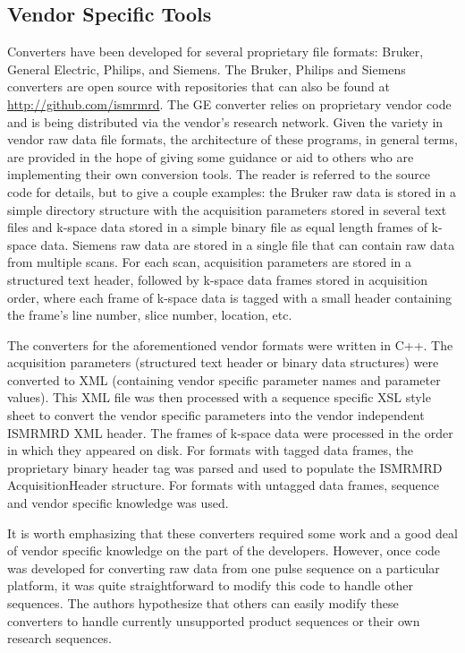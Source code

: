 \documentclass[12pt]{article}
\begin{document}
\subsection*{Vendor Specific Tools}
Converters have been developed for several proprietary file formats: Bruker, General Electric, Philips, and Siemens.  The Bruker, Philips and Siemens converters are open source with repositories that can also be found at \url{http://github.com/ismrmrd}.  The GE converter relies on proprietary vendor code and is being distributed via the vendor's research network.  Given the variety in vendor raw data file formats, the architecture of these programs, in general terms, are provided in the hope of giving some guidance or aid to others who are implementing their own conversion tools.  The reader is referred to the source code for  details, but to give a couple examples: the Bruker raw data is stored in a simple directory structure with the acquisition parameters stored in several text files and k-space data stored in a simple binary file as equal length frames of k-space data.  Siemens raw data are stored in a single file that can contain raw data from multiple scans.  For each scan, acquisition parameters are stored in a structured text header, followed by k-space data frames stored in acquisition order, where each frame of k-space data is tagged with a small header containing the frame's line number, slice number, location, etc.  

The converters for the aforementioned vendor formats were written in C++.  The acquisition parameters (structured text header or binary data structures) were converted to XML (containing vendor specific parameter names and parameter values).  This XML file was then processed with a sequence specific XSL style sheet to convert the vendor specific parameters into the vendor independent ISMRMRD XML header.  The frames of k-space data were processed in the order in which they appeared on disk.  For formats with tagged data frames, the proprietary binary header tag was parsed and used to populate the ISMRMRD AcquisitionHeader structure.  For formats with untagged data frames, sequence and vendor specific knowledge was used.  

It is worth emphasizing that these converters required some work and a good deal of vendor specific knowledge on the part of the developers.  However, once code was developed for converting raw data from one pulse sequence on a particular platform, it was quite straightforward to modify this code to handle other sequences. The authors hypothesize that others can easily modify these converters to handle currently unsupported product sequences or their own research sequences.
\end{document}
